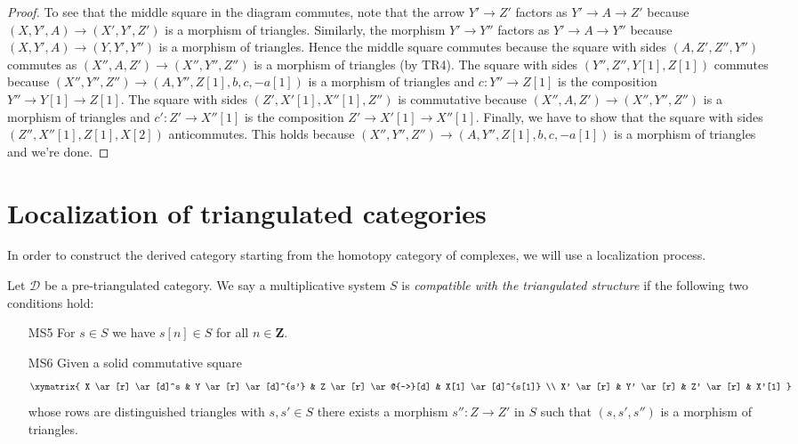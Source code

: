 \begin{proof}
\medskip\noindent
To see that the middle square in the diagram commutes, note
that the arrow $Y' \to Z'$ factors as $Y' \to A \to Z'$
because $(X, Y', A) \to (X', Y', Z')$ is a morphism of triangles.
Similarly, the morphism $Y' \to Y''$ factors as
$Y' \to A \to Y''$ because $(X, Y', A) \to (Y, Y', Y'')$ is a
morphism of triangles. Hence the middle square commutes because
the square with sides $(A, Z', Z'', Y'')$ commutes as
$(X'', A, Z') \to (X'', Y'', Z'')$ is a morphism of triangles (by TR4).
The square with sides $(Y'', Z'', Y[1], Z[1])$ commutes
because $(X'', Y'', Z'') \to (A, Y'', Z[1], b, c , -a[1])$
is a morphism of triangles and $c : Y'' \to Z[1]$ is the composition
$Y'' \to Y[1] \to Z[1]$.
The square with sides $(Z', X'[1], X''[1], Z'')$ is commutative
because $(X'', A, Z') \to (X'', Y'', Z'')$ is a morphism of triangles
and $c' : Z' \to X''[1]$ is the composition $Z' \to X'[1] \to X''[1]$.
Finally, we have to show that the square with sides
$(Z'', X''[1], Z[1], X[2])$ anticommutes. This holds because
$(X'', Y'', Z'') \to (A, Y'', Z[1], b, c , -a[1])$
is a morphism of triangles and we're done.
\end{proof}








\section{Localization of triangulated categories}
\label{section-localization}

\noindent
In order to construct the derived category starting from the homotopy
category of complexes, we will use a localization process.

\begin{definition}
\label{definition-localization}
Let $\mathcal{D}$ be a pre-triangulated category. We say a multiplicative
system $S$ is {\it compatible with the triangulated structure} if
the following two conditions hold:
\begin{enumerate}
\item[MS5] For $s \in S$ we have $s[n] \in S$ for all $n \in \mathbf{Z}$.
\item[MS6] Given a solid commutative square
$$
\xymatrix{
X \ar[r] \ar[d]^s &
Y \ar[r] \ar[d]^{s'} &
Z \ar[r] \ar@{-->}[d] &
X[1] \ar[d]^{s[1]} \\
X' \ar[r] &
Y' \ar[r] &
Z' \ar[r] &
X'[1]
}
$$
whose rows are distinguished triangles with $s, s' \in S$
there exists a morphism $s'' : Z \to Z'$ in $S$ such that
$(s, s', s'')$ is a morphism of triangles.
\end{enumerate}
\end{definition}

